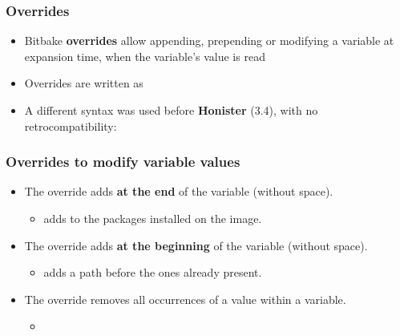 \begin{frame}
  \frametitle{Overrides}
  \begin{itemize}
  \item Bitbake \textbf{overrides} allow appending, prepending or modifying
    a variable at expansion time, when the variable's value is read
  \item Overrides are written as 
  \item A different syntax was used before \textbf{Honister} (3.4), with no
    retrocompatibility: 
  \end{itemize}
\end{frame}

\begin{frame}
  \frametitle{Overrides to modify variable values}
  \begin{itemize}
    \item The  override adds {\bf at the end} of the variable
      (without space).
      \begin{itemize}
        \item {} adds
           to the packages installed on the image.
      \end{itemize}
    \item The  override adds {\bf at the beginning} of the
      variable (without space).
      \begin{itemize}
        \item {}
          adds a path before the ones already present.
      \end{itemize}
    \item The  override removes all occurrences of a value
      within a variable.
      \begin{itemize}
        \item {}
      \end{itemize}
  \end{itemize}
\end{frame}

